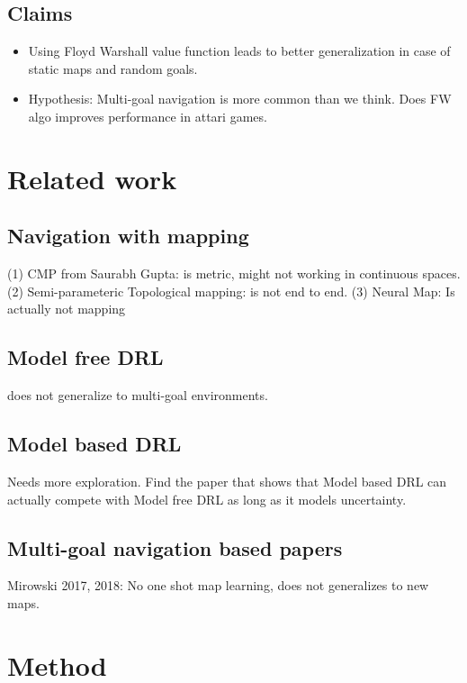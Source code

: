 \documentclass[letterpaper]{article} %
\begin{document}
\subsection{Claims}
\begin{itemize} \item
Using Floyd Warshall value function leads to better generalization in case of static maps and
random goals.
\item
Hypothesis: Multi-goal navigation is more common than we think. Does FW algo improves performance in attari games.
\end{itemize}

\section{Related work}
\subsection{Navigation with mapping}
 (1) CMP from Saurabh Gupta: is metric, might not working in continuous spaces.
 (2) Semi-parameteric Topological mapping: is not end to end.
 (3) Neural Map: Is actually not mapping

\subsection{Model free DRL }
does not generalize to multi-goal environments.

\subsection{Model based DRL}
Needs more exploration.
Find the paper that shows that Model based DRL can actually compete with Model free DRL as long as it models uncertainty.

\subsection{Multi-goal navigation based papers}
Mirowski 2017, 2018: No one shot map learning, does not generalizes to new maps.


\section{Method}
\end{document}
